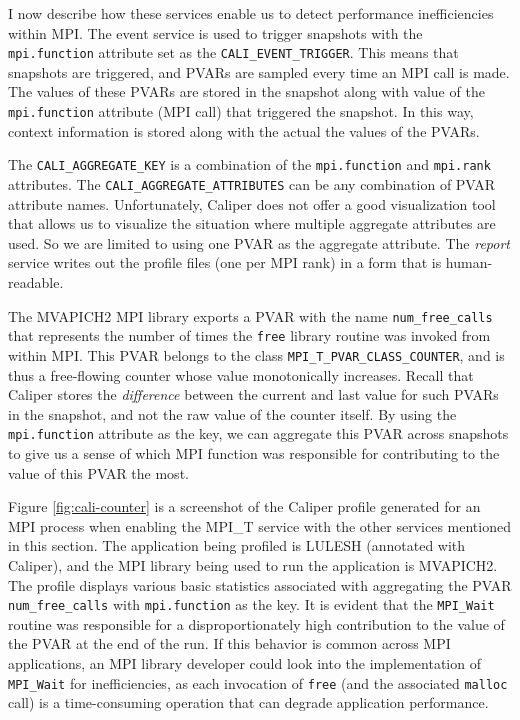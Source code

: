 \par I now describe how these services enable us to detect performance inefficiencies within MPI. The event service is used to trigger snapshots with the \verb+mpi.function+ attribute set as the \verb+CALI_EVENT_TRIGGER+. This means that snapshots are triggered, and PVARs are sampled every time an MPI call is made. The values of these PVARs are stored in the snapshot along with value of the \verb+mpi.function+ attribute (MPI call) that triggered the snapshot. In this way, context information is stored along with the actual the values of the PVARs.
\par The \verb+CALI_AGGREGATE_KEY+ is a combination of the \verb+mpi.function+ and \verb+mpi.rank+ attributes. The \verb+CALI_AGGREGATE_ATTRIBUTES+ can be any combination of PVAR attribute names. Unfortunately, Caliper does not offer a good visualization tool that allows us to visualize the situation where multiple aggregate attributes are used. So we are limited to using one PVAR as the aggregate attribute. The \textit{report} service writes out the profile files (one per MPI rank) in a form that is human-readable.
\par The MVAPICH2 MPI library exports a PVAR with the name \verb+num_free_calls+ that represents the number of times the \verb+free+ library routine was invoked from within MPI. This PVAR belongs to the class \verb+MPI_T_PVAR_CLASS_COUNTER+, and is thus a free-flowing counter whose value monotonically increases. Recall that Caliper stores the \textit{difference} between the current and last value for such PVARs in the snapshot, and not the raw value of the counter itself. By using the \verb+mpi.function+ attribute as the key, we can aggregate this PVAR across snapshots to give us a sense of which MPI function was responsible for contributing to the value of this PVAR the most. 
\par Figure \ref{fig:cali-counter} is a screenshot of the Caliper profile generated for an MPI process when enabling the MPI\_T service with the other services mentioned in this section. The application being profiled is LULESH (annotated with Caliper), and the MPI library being used to run the application is MVAPICH2. The profile displays various basic statistics associated with aggregating the PVAR \verb+num_free_calls+ with \verb+mpi.function+ as the key. It is evident that the \verb+MPI_Wait+ routine was responsible for a disproportionately high contribution to the value of the PVAR at the end of the run. If this behavior is common across MPI applications, an MPI library developer could look into the implementation of \verb+MPI_Wait+ for inefficiencies, as each invocation of \verb+free+ (and the associated \verb+malloc+ call) is a time-consuming operation that can degrade application performance.
